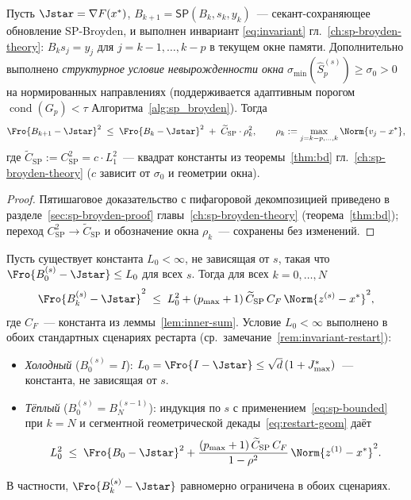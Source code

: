\begin{theorem}
\label{thm:sp-bd}
Пусть $\Jstar = \nabla F(x^{*})$, $B_{k+1} = \mathsf{SP}(B_k, s_k, y_k)$~---
секант-сохраняющее обновление SP-Broyden, и выполнен инвариант
\eqref{eq:invariant} гл.~\ref{ch:sp-broyden-theory}: $B_k s_j = y_j$
для $j = k{-}1, \ldots, k{-}p$ в текущем окне памяти. Дополнительно
выполнено \emph{структурное условие невырожденности окна}
$\sigma_{\min}(\widehat S_p^{(s)}) \ge \sigma_0 > 0$ на нормированных
направлениях (поддерживается адаптивным порогом
$\operatorname{cond}(G_p) < \tau$ Алгоритма~\ref{alg:sp_broyden}).
Тогда
\begin{equation}
\Fro{B_{k+1} - \Jstar}^{2} \;\le\; \Fro{B_k - \Jstar}^{2}
\;+\; \widetilde C_{\mathrm{SP}} \cdot \rho_k^{2},
\qquad
\rho_k := \max_{j = k{-}p,\ldots,k}\Norm{v_j - x^{*}},
\label{eq:sp-bd}
\end{equation}
где $\widetilde C_{\mathrm{SP}} := C_{\mathrm{SP}}^{2} = c\cdot L_1^{2}$~---
квадрат константы из теоремы~\ref{thm:bd}
гл.~\ref{ch:sp-broyden-theory} ($c$ зависит от $\sigma_0$ и геометрии окна).
\end{theorem}

\begin{proof}
Пятишаговое доказательство с пифагоровой декомпозицией приведено в
разделе~\ref{sec:sp-broyden-proof} главы~\ref{ch:sp-broyden-theory}
(теорема~\ref{thm:bd}); переход $C_{\mathrm{SP}}^{2} \to \widetilde C_{\mathrm{SP}}$
и обозначение окна $\rho_k$~--- сохранены без изменений.
\end{proof}

\begin{corollary}
\label{cor:sp-in-segment}
Пусть существует константа $L_0 < \infty$, не зависящая от $s$,
такая что $\Fro{B_0^{(s)} - \Jstar} \le L_0$ для всех $s$. Тогда для
всех $k = 0, \ldots, N$
\begin{equation}
\Fro{B_k^{(s)} - \Jstar}^{2}
\;\le\;
L_0^{2} + (p_{\max}+1)\,\widetilde C_{\mathrm{SP}}\,C_F\,\Norm{z^{(s)} - x^{*}}^{2},
\label{eq:sp-bounded}
\end{equation}
где $C_F$~--- константа из леммы~\ref{lem:inner-sum}.
Условие $L_0 < \infty$ выполнено в обоих стандартных сценариях рестарта
(ср.\ замечание~\ref{rem:invariant-restart}):
\begin{itemize}
\item \emph{Холодный} ($B_0^{(s)} = I$):
      $L_0 = \Fro{I - \Jstar} \le \sqrt{d}\,(1 + J^{*}_{\max})$~---
      константа, не зависящая от $s$.
\item \emph{Тёплый} ($B_0^{(s)} = B_N^{(s-1)}$): индукция по $s$ с
      применением~\eqref{eq:sp-bounded} при $k = N$ и
      сегментной геометрической декады~\eqref{eq:restart-geom} даёт
      \begin{equation}
      L_0^{2} \;\le\; \Fro{B_0 - \Jstar}^{2}
      + \frac{(p_{\max}+1)\,\widetilde C_{\mathrm{SP}}\,C_F}{1 - \rho^{2}}\,\Norm{z^{(1)} - x^{*}}^{2}.
      \label{eq:L0-warm}
      \end{equation}
\end{itemize}
В частности, $\Fro{B_k^{(s)} - \Jstar}$ равномерно ограничена в обоих
сценариях.
\end{corollary}

